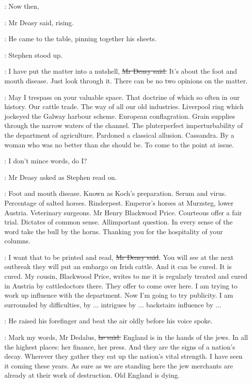 \deasy:
Now then,

:
Mr Deasy said, rising.

:
He came to the table, pinning together his sheets.

:
Stephen stood up.

\deasy:
I have put the matter into a nutshell, \sout{Mr Deasy said.}
It's about the foot and mouth disease.
Just look through it.
There can be no two opinions on the matter.

\StephenInt: \stage{[paraphrasing]}
May I trespass on your valuable space.
That doctrine of  which so often in our history.
Our cattle trade.
The way of all our old industries.
Liverpool ring which jockeyed the Galway harbour scheme.
European conflagration.
Grain supplies through the narrow waters of the channel.
The pluterperfect imperturbability of the department of agriculture.
Pardoned a classical allusion.
Cassandra.
By a woman who was no better than she should be.
To come to the point at issue.

\deasy:
I don't mince words, do I?

:
Mr Deasy asked as Stephen read on.

\StephenInt: \stage{[paraphrasing]}
Foot and mouth disease.
Known as Koch's preparation.
Serum and virus.
Percentage of salted horses.
Rinderpest.
Emperor's horses at Murzsteg, lower Austria.
Veterinary surgeons.
Mr Henry Blackwood Price.
Courteous offer a fair trial.
Dictates of common sense.
Allimportant question.
In every sense of the word take the bull by the horns.
Thanking you for the hospitality of your columns.

\deasy:
I want that to be printed and read, \sout{Mr Deasy said}.
You will see at the next outbreak they will put an embargo on Irish cattle.
And it can be cured.
It is cured.
My cousin, Blackwood Price, writes to me
it is regularly treated and cured in Austria by cattledoctors there.
They offer to come over here.
I am trying to work up influence with the department.
Now I'm going to try publicity.
I am surrounded by difficulties,
by ... intrigues by ... backstairs influence by ...

:
He raised his forefinger and beat the air oldly before his voice spoke.

\deasy:
Mark my words, Mr Dedalus, \sout{he said.}
England is in the hands of the jews.
In all the highest places: her finance, her press.
And they are the signs of a nation's decay.
Wherever they gather they eat up the nation's vital strength.
I have seen it coming these years.
As sure as we are standing here
the jew merchants are already at their work of destruction.
Old England is dying.

